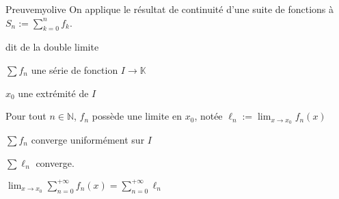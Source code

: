     \begin{demo}{Preuve}{myolive}
        On applique le résultat de continuité d’une suite de fonctions à $S_n := \sum_{k=0}^n f_k$.
    \end{demo}

    \begin{theo}{dit de la double limite}{}
        \begin{soient}
            \item $\sum f_n$ une série de fonction $I \to \mathbb{K}$
            \item $x_0$ une extrémité de $I$
        \end{soient}
        \begin{suppose}
            \item Pour tout $n \in \mathbb{N}$, $f_n$ possède une limite en $x_0$, notée $\ell_n := \lim_{x \to x_0} f_n(x)$
            \item $\sum f_n$ converge uniformément sur $I$
        \end{suppose}
        \begin{alors}
            \item $\sum \ell_n$ converge.
            \item $\lim_{x \to x_0} \sum_{n=0}^{+\infty} f_n(x) = \sum_{n=0}^{+\infty} \ell_n$
        \end{alors}
    \end{theo}

